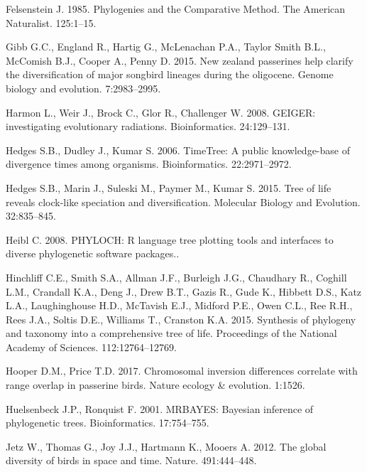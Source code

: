 \documentclass[]{article}
\begin{document}
\leavevmode\hypertarget{ref-Felsenstein1985a}{}%
Felsenstein J. 1985. Phylogenies and the Comparative Method. The American Naturalist. 125:1--15.

\leavevmode\hypertarget{ref-gibb2015new}{}%
Gibb G.C., England R., Hartig G., McLenachan P.A., Taylor Smith B.L., McComish B.J., Cooper A., Penny D. 2015. New zealand passerines help clarify the diversification of major songbird lineages during the oligocene. Genome biology and evolution. 7:2983--2995.

\leavevmode\hypertarget{ref-Harmon2008}{}%
Harmon L., Weir J., Brock C., Glor R., Challenger W. 2008. GEIGER: investigating evolutionary radiations. Bioinformatics. 24:129--131.

\leavevmode\hypertarget{ref-Hedges2006}{}%
Hedges S.B., Dudley J., Kumar S. 2006. TimeTree: A public knowledge-base of divergence times among organisms. Bioinformatics. 22:2971--2972.

\leavevmode\hypertarget{ref-Hedges2015}{}%
Hedges S.B., Marin J., Suleski M., Paymer M., Kumar S. 2015. Tree of life reveals clock-like speciation and diversification. Molecular Biology and Evolution. 32:835--845.

\leavevmode\hypertarget{ref-Heibl2008}{}%
Heibl C. 2008. PHYLOCH: R language tree plotting tools and interfaces to diverse phylogenetic software packages..

\leavevmode\hypertarget{ref-Hinchliff2015}{}%
Hinchliff C.E., Smith S.A., Allman J.F., Burleigh J.G., Chaudhary R., Coghill L.M., Crandall K.A., Deng J., Drew B.T., Gazis R., Gude K., Hibbett D.S., Katz L.A., Laughinghouse H.D., McTavish E.J., Midford P.E., Owen C.L., Ree R.H., Rees J.A., Soltis D.E., Williams T., Cranston K.A. 2015. Synthesis of phylogeny and taxonomy into a comprehensive tree of life. Proceedings of the National Academy of Sciences. 112:12764--12769.

\leavevmode\hypertarget{ref-hooper2017chromosomal}{}%
Hooper D.M., Price T.D. 2017. Chromosomal inversion differences correlate with range overlap in passerine birds. Nature ecology \& evolution. 1:1526.

\leavevmode\hypertarget{ref-Huelsenbeck2001}{}%
Huelsenbeck J.P., Ronquist F. 2001. MRBAYES: Bayesian inference of phylogenetic trees. Bioinformatics. 17:754--755.

\leavevmode\hypertarget{ref-Jetz2012}{}%
Jetz W., Thomas G., Joy J.J., Hartmann K., Mooers A. 2012. The global diversity of birds in space and time. Nature. 491:444--448.
\end{document}
